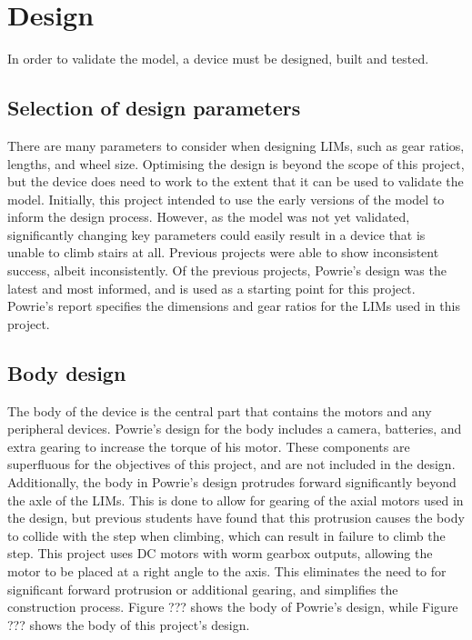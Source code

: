 \chapter{Design}

In order to validate the model, a device must be designed, built and tested. 

\section{Selection of design parameters}
There are many parameters to consider when designing LIMs, such as gear ratios, lengths, and wheel size. Optimising the design is beyond the scope of this project, but the device does need to work to the extent that it can be used to validate the model. Initially, this project intended to use the early versions of the model to inform the design process. However, as the model was not yet validated, significantly changing key parameters could easily result in a device that is unable to climb stairs at all. Previous projects were able to show inconsistent success, albeit inconsistently. Of the previous projects, Powrie's design was the latest and most informed, and is used as a starting point for this project. Powrie's report specifies the dimensions and gear ratios for the LIMs used in this project.\\

\section{Body design}
The body of the device is the central part that contains the motors and any peripheral devices.
Powrie's design for the body includes a camera, batteries, and extra gearing to increase the torque of his motor. These components are superfluous for the objectives of this project, and are not included in the design. Additionally, the body in Powrie's design protrudes forward significantly beyond the axle of the LIMs. This is done to allow for gearing of the axial motors used in the design, but previous students have found that this protrusion causes the body to collide with the step when climbing, which can result in failure to climb the step. This project uses DC motors with worm gearbox outputs, allowing the motor to be placed at a right angle to the axis. This eliminates the need to for significant forward protrusion or additional gearing, and simplifies the construction process. Figure ??? shows the body of Powrie's design, while Figure ??? shows the body of this project's design.

